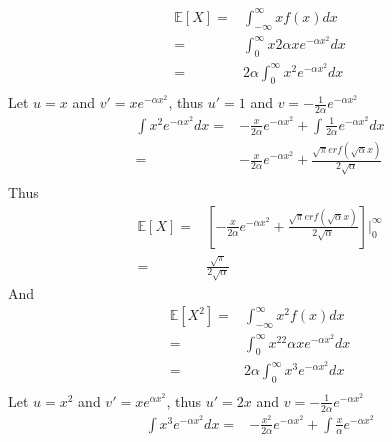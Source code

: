 \documentclass{article}
\begin{document}
    \section{}
        \begin{equation*}
            \begin{split}
                \mathbb{E}[X]=&\int_{-\infty}^{\infty}xf(x)dx\\
                    =&\int_{0}^{\infty}x2\alpha xe^{-\alpha x^2}dx\\
                    =&2\alpha\int_{0}^{\infty} x^2e^{-\alpha x^2}dx\\
            \end{split}
        \end{equation*}
        Let $u=x$ and $v'=xe^{-\alpha x^2}$, thus $u'=1$ and $v=-\frac{1}{2\alpha}e^{-\alpha x^2}$
        \begin{equation*}
            \begin{split}
                \int x^2e^{-\alpha x^2}dx=&-\frac{x}{2\alpha}e^{-\alpha x^2}+\int \frac{1}{2\alpha}e^{-\alpha x^2}dx\\
                    =&-\frac{x}{2\alpha}e^{-\alpha x^2}+\frac{\sqrt{\pi}erf(\sqrt{\alpha}x)}{2\sqrt{\alpha}}\\
            \end{split}
        \end{equation*}
        Thus
        \begin{equation*}
            \begin{split}
                \mathbb{E}[X]=&[-\frac{x}{2\alpha}e^{-\alpha x^2}+\frac{\sqrt{\pi}erf(\sqrt{\alpha}x)}{2\sqrt{\alpha}}]|_0^{\infty}\\
                    =&\frac{\sqrt{\pi}}{2\sqrt{\alpha}}
            \end{split}
        \end{equation*}
        And 
        \begin{equation*}
            \begin{split}
                \mathbb{E}[X^2]=&\int_{-\infty}^{\infty}x^2f(x)dx\\
                    =&\int_{0}^{\infty}x^22\alpha xe^{-\alpha x^2}dx\\
                    =&2\alpha\int_{0}^{\infty}x^3e^{-\alpha x^2}dx\\
            \end{split}
        \end{equation*}
        Let $u=x^2$ and $v'=xe^{\alpha x^2}$, thus $u'=2x$ and $v=-\frac{1}{2\alpha}e^{-\alpha x^2}$
        \begin{equation*}
            \begin{split}
                \int x^3e^{-\alpha x^2}dx=&-\frac{x^2}{2\alpha}e^{-\alpha x^2}+\int \frac{x}{\alpha}e^{-\alpha x^2}
            \end{split}
        \end{equation*}
\end{document}
